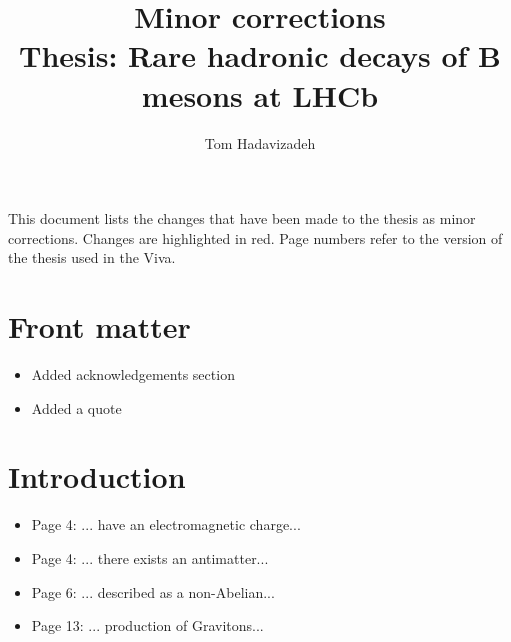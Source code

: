 \documentclass[12pt]{article}
\title{Minor corrections\\
Thesis: Rare hadronic decays of B mesons at LHCb}
\author{Tom Hadavizadeh}
\begin{document}
\maketitle

This document lists the changes that have been made to the thesis as minor corrections. Changes are highlighted in red. Page numbers refer to the version of the thesis used in the Viva. 

\section{Front matter}

\begin{itemize}
\item Added acknowledgements section
\item Added a quote

\end{itemize}
\section{Introduction}



\begin{itemize}
\item Page 4: ... have {\color{red}an} electromagnetic charge...
\item Page 4: ... there exists {\color{red}an} antimatter...
\item Page 6: ... described {\color{red}as} a non-Abelian...
\item Page 13: ... production {\color{red}of} Gravitons...
\end{itemize}
\end{document}
